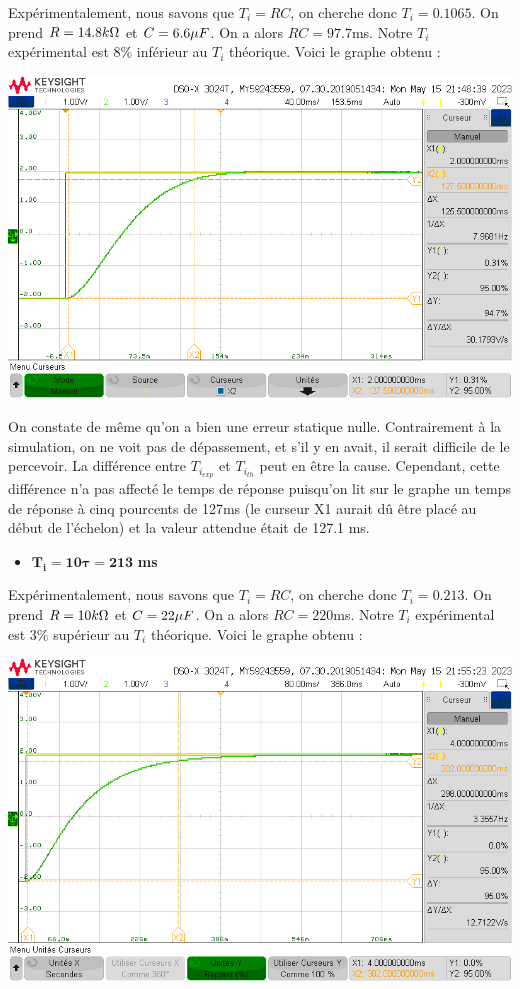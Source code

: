 \documentclass[12pt]{article}
\begin{document}
Expérimentalement, nous savons que $T_i = RC$, on cherche donc $T_i = 0.1065$. On prend $R=14.8 \space k\Omega$ et $C = 6.6 \space \mu F$. On a alors $RC = 97.7$ms. Notre $T_i$ expérimental est 8$\%$ inférieur au $T_i$ théorique.
Voici le graphe obtenu : 
\begin{center}
    \includegraphics[width = 16 cm]{TP3/Syst_1/I/tr5prc-syst1-ti=5tau.png}
\end{center}
On constate de même qu'on a bien une erreur statique nulle. Contrairement à la simulation, on ne voit pas de dépassement, et s'il y en avait, il serait difficile de le percevoir. La différence entre $T_{i_{exp}}$ et $T_{i_{th}}$ peut en être la cause. Cependant, cette différence n'a pas affecté le temps de réponse puisqu'on lit sur le graphe un temps de réponse à cinq pourcents de 127ms (le curseur X1 aurait dû être placé au début de l'échelon) et la valeur attendue était de 127.1 ms. 
\newpage
\begin{itemize}
    \item \large $\mathbf{T_i = 10\tau = 213}$ \bf ms
\end{itemize}
Expérimentalement, nous savons que $T_i = RC$, on cherche donc $T_i = 0.213$. On prend $R=10 \space k\Omega$ et $C = 22\space \mu F$. On a alors $RC = 220$ms. Notre $T_i$ expérimental est 3$\%$ supérieur au $T_i$ théorique.
Voici le graphe obtenu : 
\begin{center}
    \includegraphics[width = 16 cm]{TP3/Syst_1/I/tr5pc-syst1-ti=10tau.png}
\end{center}
\end{document}
